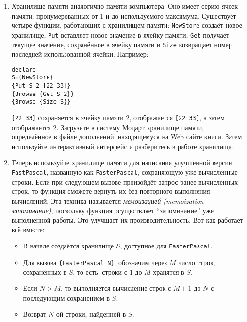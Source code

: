 \begin{enumerate}
{  \begin{enumerate}

    \item{Хранилище памяти аналогично памяти компьютера. Оно имеет серию ячеек памяти, пронумерованных от 1 и до используемого максимума. Существует четыре функции, работающих с хранилищем памяти: \lstinline|NewStore| создаёт новое хранилище, \lstinline|Put| вставляет новое значение в ячейку памяти, \lstinline|Get| получает текущее значение, сохранённое в ячейку памяти и \lstinline|Size| возвращает номер последней использованной ячейки. Например:

      \begin{lstlisting}
declare
S={NewStore}
{Put S 2 [22 33]}
{Browse {Get S 2}}
{Browse {Size S}}
\end{lstlisting}

      \lstinline|[22 33]| сохраняется в ячейку памяти 2, отображается \lstinline|[22 33]|, а затем отображается 2. Загрузите в систему Моцарт хранилище памяти, определённое в файле дополнений, находящемуся на Web сайте книги. Затем используйте интерактивный интерфейс и разберитесь в работе хранилища.}

\item{Теперь используйте хранилище памяти для написания улучшенной версии \lstinline|FastPascal|, названную как \lstinline|FasterPascal|, сохраняющую уже вычисленные строки. Если при следующем вызове произойдёт запрос ранее вычисленных строк, то функция сможете вернуть их без повторного выполнения вычислений. Эта техника называется \emph{мемоизацией (memoization - запоминание)}, поскольку функция осуществляет ``запоминание'' уже выполненной работы. Это улучшает их производительность. Вот как работает всё вместе:

  \begin{itemize}
\item{В начале создаётся хранилище $S$, доступное для \lstinline|FasterPascal|.}

\item{Для вызова \lstinline|{FasterPascal N}|, обозначим через $M$ число строк, сохранённых в $S$, то есть, строки с 1 до $M$ хранятся в $S$.}

\item{Если $N>M$, то выполняется вычисление строк с $M+1$ до $N$ с последующим сохранением в $S$.}

\item{Возврат $N$-ой строки, найденной в $S$.}
\end{itemize}

}
\end{enumerate}}
\end{enumerate}

